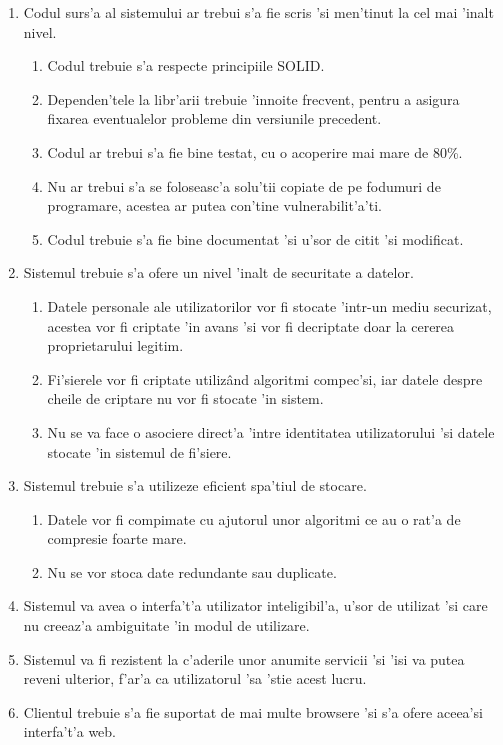 \documentclass[12pt,a4paper,twoside]{report}
\begin{document}
\begin{enumerate}[label=CNF\arabic*]

\item{
Codul surs'a al sistemului ar trebui s'a fie scris 'si men'tinut la cel mai 'inalt nivel.
\begin{enumerate}[label=(\arabic*)]
\item{Codul trebuie s'a respecte principiile SOLID.}
\item{Dependen'tele la libr'arii trebuie 'innoite frecvent, pentru a asigura fixarea eventualelor probleme din versiunile precedent.}
\item{Codul ar trebui s'a fie bine testat, cu o acoperire  mai mare de 80\%.}
\item{Nu ar trebui s'a se foloseasc'a solu'tii copiate de pe fodumuri de programare, acestea ar putea con'tine vulnerabilit'a'ti.}
\item{Codul trebuie s'a fie bine documentat 'si u'sor de citit 'si modificat.}
\end{enumerate}
}

\item{
Sistemul trebuie s'a ofere un nivel 'inalt de securitate a datelor.
\begin{enumerate}[label=(\arabic*)]
\item{Datele personale ale utilizatorilor vor fi stocate 'intr-un mediu securizat, acestea vor fi criptate 'in avans 'si vor fi decriptate doar la cererea proprietarului legitim.}
\item{Fi'sierele vor fi criptate utilizând algoritmi compec'si, iar datele despre cheile de criptare nu vor fi stocate 'in sistem.}
\item{Nu se va face o asociere direct'a 'intre identitatea utilizatorului 'si datele stocate 'in sistemul de fi'siere.}
\end{enumerate}
}

\item{Sistemul trebuie s'a utilizeze eficient spa'tiul de stocare.
\begin{enumerate}[label=(\arabic*)]
\item{Datele vor fi compimate cu ajutorul unor algoritmi ce au o rat'a de compresie foarte mare.}
\item{Nu se vor stoca date redundante sau duplicate.}
\end{enumerate}
}

\item{Sistemul va avea o interfa't'a utilizator inteligibil'a, u'sor de utilizat 'si care nu creeaz'a ambiguitate 'in modul de utilizare.}

\item{Sistemul va fi rezistent la c'aderile unor anumite servicii 'si 'isi va putea reveni ulterior, f'ar'a ca utilizatorul 'sa 'stie acest lucru.}

\item{Clientul trebuie s'a fie suportat de mai multe browsere 'si s'a ofere aceea'si interfa't'a web.}

\end{enumerate}
\end{document}

